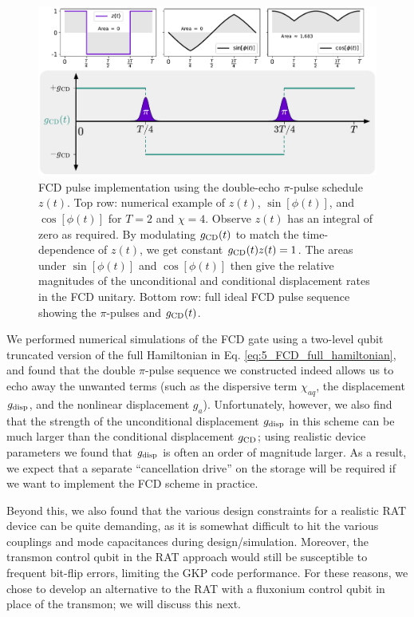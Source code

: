 \begin{figure}[t]
    \centering
    \includegraphics[width=\linewidth]{Figures/5/double_echo_FCD.pdf}
    \caption[Ideal pulse sequence for a double-echo ``fast conditional displacement'' (FCD) gate.]{FCD pulse implementation using the double-echo $\pi$-pulse schedule $z(t)$. Top row: numerical example of $z(t)$, $\sin[\phi(t)]$, and $\cos[\phi(t)]$ for $T = 2$ and $\chi = 4$. Observe $z(t)$ has an integral of zero as required. By modulating $g_{\rm CD}(t)$ to match the time-dependence of $z(t)$, we get constant $g_{\rm CD}(t)z(t) = 1$. The areas under $\sin[\phi(t)]$ and $\cos[\phi(t)]$ then give the relative magnitudes of the unconditional and conditional displacement rates in the FCD unitary. Bottom row: full ideal FCD pulse sequence showing the $\pi$-pulses and $g_{\rm CD}(t)$.}
    \label{fig:5_double_echo_FCD}
\end{figure}

We performed numerical simulations of the FCD gate using a two-level qubit truncated version of the full Hamiltonian in Eq. \eqref{eq:5_FCD_full_hamiltonian}, and found that the double $\pi$-pulse sequence we constructed indeed allows us to echo away the unwanted terms (such as the dispersive term $\chi_{aq}$, the displacement $g_{\rm disp}$, and the nonlinear displacement $g_a$). Unfortunately, however, we also find that the strength of the unconditional displacement $g_{\rm disp}$ in this scheme can be much larger than the conditional displacement $g_{\rm CD}$; using realistic device parameters we found that $g_{\rm disp}$ is often an order of magnitude larger. As a result, we expect that a separate ``cancellation drive'' on the storage will be required if we want to implement the FCD scheme in practice. 

Beyond this, we also found that the various design constraints for a realistic RAT device can be quite demanding, as it is somewhat difficult to hit the various couplings and mode capacitances during design/simulation. Moreover, the transmon control qubit in the RAT approach would still be susceptible to frequent bit-flip errors, limiting the GKP code performance. For these reasons, we chose to develop an alternative to the RAT with a fluxonium control qubit in place of the transmon; we will discuss this next. 

